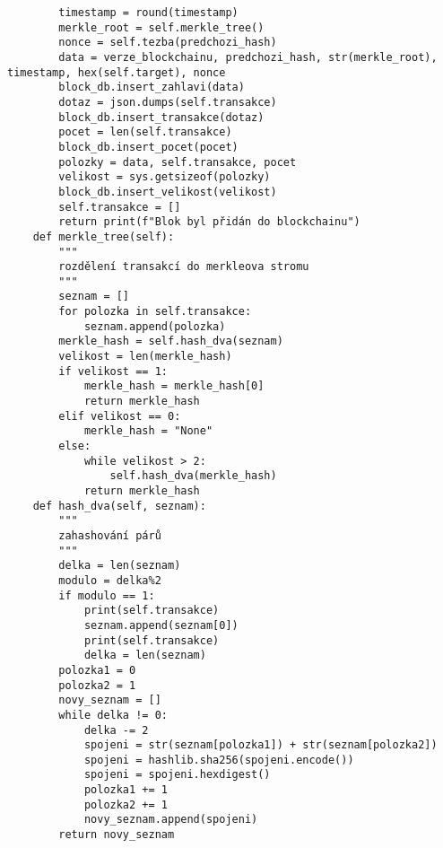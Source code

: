 \documentclass[12pt]{report}			%
\begin{document}
{\begin{appendices}
\begin{lstlisting}
        timestamp = round(timestamp)
        merkle_root = self.merkle_tree()
        nonce = self.tezba(predchozi_hash)
        data = verze_blockchainu, predchozi_hash, str(merkle_root), timestamp, hex(self.target), nonce
        block_db.insert_zahlavi(data)
        dotaz = json.dumps(self.transakce)
        block_db.insert_transakce(dotaz)
        pocet = len(self.transakce)
        block_db.insert_pocet(pocet)
        polozky = data, self.transakce, pocet
        velikost = sys.getsizeof(polozky)
        block_db.insert_velikost(velikost)
        self.transakce = []
        return print(f"Blok byl přidán do blockchainu")
    def merkle_tree(self):
        """
        rozdělení transakcí do merkleova stromu
        """
        seznam = []
        for polozka in self.transakce:
            seznam.append(polozka)
        merkle_hash = self.hash_dva(seznam)
        velikost = len(merkle_hash)
        if velikost == 1:
            merkle_hash = merkle_hash[0]
            return merkle_hash
        elif velikost == 0:
            merkle_hash = "None"
        else:
            while velikost > 2:
                self.hash_dva(merkle_hash)
            return merkle_hash
    def hash_dva(self, seznam):
        """
        zahashování párů
        """
        delka = len(seznam)
        modulo = delka%2
        if modulo == 1:
            print(self.transakce)
            seznam.append(seznam[0])
            print(self.transakce)
            delka = len(seznam)
        polozka1 = 0
        polozka2 = 1
        novy_seznam = []
        while delka != 0:
            delka -= 2
            spojeni = str(seznam[polozka1]) + str(seznam[polozka2])
            spojeni = hashlib.sha256(spojeni.encode())
            spojeni = spojeni.hexdigest()
            polozka1 += 1
            polozka2 += 1
            novy_seznam.append(spojeni)
        return novy_seznam
    

\end{lstlisting}
\end{appendices}}
\end{document}
